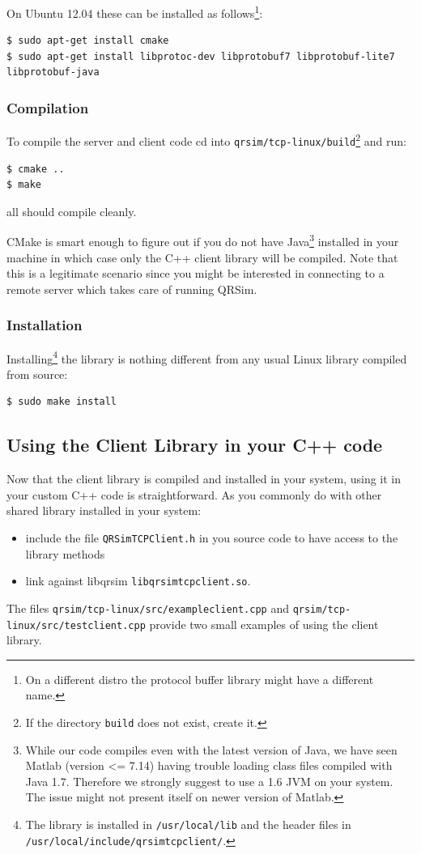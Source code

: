 \documentclass[a4paper,11pt]{report}
\begin{document}
On Ubuntu 12.04 these can be installed as follows\footnote{On a different distro the protocol buffer library might have a different name.}:
\begin{verbatim}
$ sudo apt-get install cmake
$ sudo apt-get install libprotoc-dev libprotobuf7 libprotobuf-lite7 libprotobuf-java
\end{verbatim}

\subsubsection{Compilation} \label{comp}
To compile the server and client code cd into \texttt{qrsim/tcp-linux/build}\footnote{If the directory \texttt{build} does not exist, create it.} and run:
 \begin{verbatim}
$ cmake ..
$ make
\end{verbatim}
all should compile cleanly.

CMake is smart enough to figure out if you do not have Java\footnote{While our code compiles even with the latest version of Java, we have seen Matlab (version <= 7.14) having trouble loading class files compiled with Java 1.7. Therefore we strongly suggest to use a 1.6 JVM on your system. The issue might not present itself on newer version of Matlab.} installed in your machine in which case only the C++ client library will be compiled.
Note that this is a legitimate scenario since you might be interested in connecting to a remote server which takes care of running QRSim. 

\subsubsection{Installation}\label{inst}
Installing\footnote{The library is installed in \texttt{/usr/local/lib} and the header files in \texttt{/usr/local/include/qrsimtcpclient/}.} the library is nothing different from any usual Linux library compiled from source:

\begin{verbatim}
$ sudo make install
\end{verbatim}

\subsection{Using the Client Library in your C++ code}

Now that the client library is compiled and installed in your system, using it in your custom C++ code is straightforward.
As you commonly do with other shared library installed in your system:
\begin{itemize}
\item include the file \texttt{QRSimTCPClient.h} in you source code to have access to the library methods
\item link against libqrsim \texttt{libqrsimtcpclient.so}.
\end{itemize}
The files \texttt{qrsim/tcp-linux/src/exampleclient.cpp} and \texttt{qrsim/tcp-linux/src/testclient.cpp} provide two small examples of using the client library.
\end{document}
